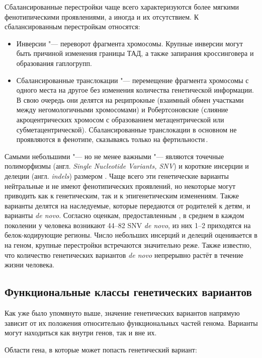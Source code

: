 \documentclass[a4paper,14pt]{extarticle}
\newcommand{\ecitep}[1]{\textenglish{\citep{#1}}}
\newcommand{\engterm}[1]{англ. \textenglish{\textit{#1}}}
\begin{document}
Сбалансированные перестройки чаще всего характеризуются более мягкими фенотипическими проявлениями, а иногда и их отсутствием.
К сбалансированным перестройкам относятся:

\begin{itemize}
	\item Инверсии "--- переворот фрагмента хромосомы.
	 Крупные инверсии могут быть причиной изменения границы ТАД, а также запирания кроссинговера и образования гаплогрупп.
	\item Сбалансированные транслокации "--- перемещение фрагмента хромосомы с одного места на другое без изменения количества генетической информации.
	 В свою очередь они делятся на реципрокные (взаимный обмен участками между негомологичными хромосомами) и Робертсоновские (слияние акроцентрических хромосом с образованием метацентрической или субметацентрической).
	 Сбалансированные транслокации в основном не проявляются в фенотипе, сказываясь только на фертильности\,\ecitep{Dong_2012}.
\end{itemize}

Самыми небольшими "--- но не менее важными "--- являются точечные полиморфизмы (\engterm{Single Nucleotide Variants, SNV}) и короткие инсерции и делеции (\engterm{indels}) размером .
Чаще всего эти генетические варианты нейтральные и не имеют фенотипических проявлений, но некоторые могут приводить как к генетическим, так и к эпигенетическим изменениям.
Также варианты делятся на наследуемые, которые передаются от родителей к детям, и варианты \textit{de novo}.
Согласно оценкам, предоставленным \citet{Acuna_Hidalgo_2016}, в среднем в каждом поколении у человека возникают 44--82 SNV \textit{de novo}, из них 1--2 приходятся на белок-кодирующие регионы.
Число небольших инсерций и делеций оценивается в  на геном, крупные перестройки встречаются значительно реже.
Также известно, что количество генетических вариантов \textit{de novo} непрерывно растёт в течение жизни человека.

\subsection{Функциональные классы генетических вариантов}

Как уже было упомянуто выше, значение генетических вариантов напрямую зависит от их положения относительно функциональных частей генома.
Варианты могут находиться как внутри генов, так и вне их.

Области гена, в которые может попасть генетический вариант:
\end{document}
